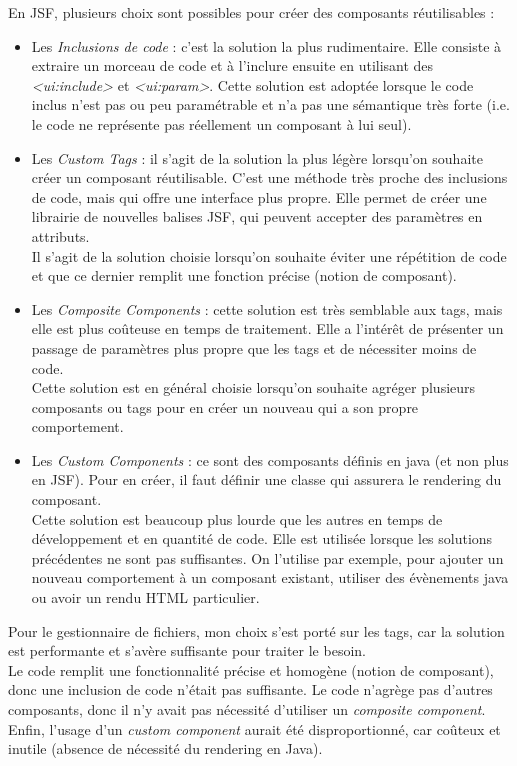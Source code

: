En JSF, plusieurs choix sont possibles pour créer des composants réutilisables : 
\begin{itemize}
\item Les \textit{Inclusions de code} : c'est la solution la plus rudimentaire. Elle consiste à extraire un morceau de code et à l'inclure ensuite en utilisant des \textit{<ui:include>} et \textit{<ui:param>}. Cette solution est adoptée lorsque le code inclus n'est pas ou peu paramétrable et n'a pas une sémantique très forte (i.e. le code ne représente pas réellement un composant à lui seul).
\item Les \textit{Custom Tags} : il s'agit de la solution la plus légère lorsqu'on souhaite créer un composant réutilisable. C'est une méthode très proche des inclusions de code, mais qui offre une interface plus propre. Elle permet de créer une librairie de nouvelles balises JSF, qui peuvent accepter des paramètres en attributs. \\
Il s'agit de la solution choisie lorsqu'on souhaite éviter une répétition de code et que ce dernier remplit une fonction précise (notion de composant).
\item Les \textit{Composite Components\cite{bib:compositeComponent}} : cette solution est très semblable aux tags, mais elle est plus coûteuse en temps de traitement. Elle a l'intérêt de présenter un passage de paramètres plus propre que les tags et de nécessiter moins de code.\\
Cette solution est en général choisie lorsqu'on souhaite agréger plusieurs composants ou tags pour en créer un nouveau qui a son propre comportement.
\item Les \textit{Custom Components} : ce sont des composants définis en java (et non plus en JSF). Pour en créer, il faut définir une classe qui assurera le rendering du composant.\\
Cette solution est beaucoup plus lourde que les autres en temps de développement et en quantité de code. Elle est utilisée lorsque les solutions précédentes ne sont pas suffisantes. On l'utilise par exemple, pour ajouter un nouveau comportement à un composant existant, utiliser des évènements java ou avoir un rendu HTML particulier. 
\end{itemize}

Pour le gestionnaire de fichiers, mon choix s'est porté sur les tags, car la solution est performante et s'avère suffisante pour traiter le besoin.\\
Le code remplit une fonctionnalité précise et homogène (notion de composant), donc une inclusion de code n'était pas suffisante. Le code n'agrège pas d'autres composants, donc il n'y avait pas nécessité d'utiliser un \textit{composite component}. Enfin, l'usage d'un \textit{custom component} aurait été disproportionné, car coûteux et inutile (absence de nécessité du rendering en Java).

